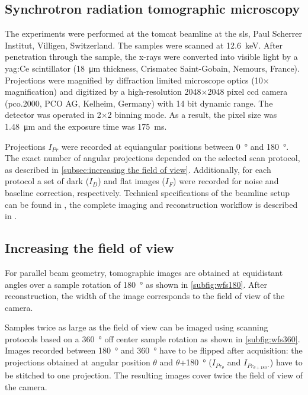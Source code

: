 \subsection{Synchrotron radiation tomographic microscopy}
The experiments were performed at the \ac{tomcat} beamline at the \acl{sls}, Paul Scherrer Institut, Villigen, Switzerland. The samples were scanned at \SI{12.6}{\kilo\electronvolt}. After penetration through the sample, the x-rays were converted into visible light by a \acs{yag}:Ce scintillator (\SI{18}{\micro\meter} thickness, Crismatec Saint-Gobain, Nemours, France). Projections were magnified by diffraction limited microscope optics (10$\times$ magnification) and digitized by a high-resolution 2048$\times$2048 pixel \ac{ccd} camera (pco.2000, PCO AG, Kelheim, Germany) with 14 bit dynamic range. The detector was operated in 2$\times$2 binning mode. As a result, the pixel size was \SI{1.48}{\micro\meter} and the exposure time was \SI{175}{\milli\second}.

Projections $I_{Pr}$ were recorded at equiangular positions between \SI{0}{\degree} and \SI{180}{\degree}. The exact number of angular projections depended on the selected scan protocol, as described in \autoref{subsec:increasing the field of view}. Additionally, for each protocol a set of dark ($I_{D}$) and flat images ($I_{F}$) were recorded for noise and baseline correction, respectively. Technical specifications of the beamline setup can be found in \cite{Stampanoni2006a}, the complete imaging and reconstruction workflow is described in \cite{Hintermueller2010}.

\subsection{Increasing the field of view}\label{subsec:increasing the field of view}
For parallel beam geometry, tomographic images are obtained at equidistant angles over a sample rotation of \SI{180}{\degree} as shown in \autoref{subfig:wfs180}. After reconstruction, the width of the image corresponds to the field of view of the camera.

Samples twice as large as the field of view can be imaged using scanning protocols based on a \SI{360}{\degree} off center sample rotation as shown in \autoref{subfig:wfs360}. Images recorded between \SI{180}{\degree} and \SI{360}{\degree} have to be flipped after acquisition: the projections obtained at angular position $\theta$ and $\theta$+\SI{180}{\degree} ($I_{Pr_{\theta}}$ and $I_{Pr_{\theta+\SI{180}{\degree}}}$) have to be stitched to one projection. The resulting images cover twice the field of view of the camera.

